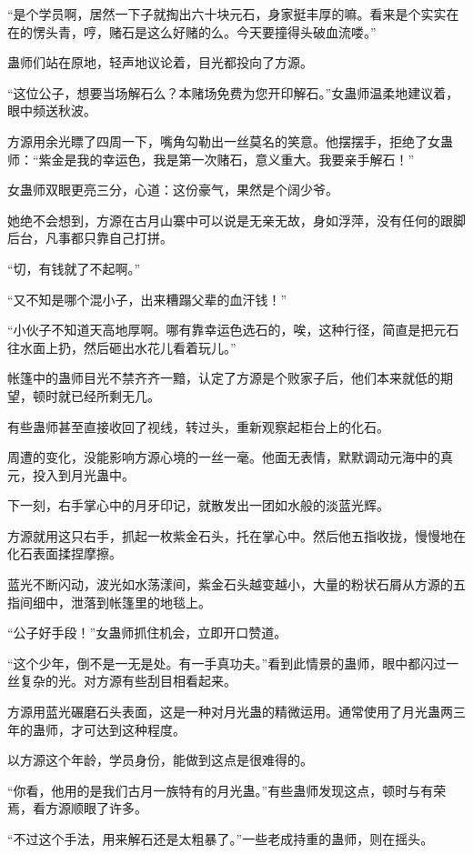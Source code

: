 \begin{this_body}
“是个学员啊，居然一下子就掏出六十块元石，身家挺丰厚的嘛。看来是个实实在在的愣头青，哼，赌石是这么好赌的么。今天要撞得头破血流喽。”

蛊师们站在原地，轻声地议论着，目光都投向了方源。

“这位公子，想要当场解石么？本赌场免费为您开印解石。”女蛊师温柔地建议着，眼中频送秋波。

方源用余光瞟了四周一下，嘴角勾勒出一丝莫名的笑意。他摆摆手，拒绝了女蛊师：“紫金是我的幸运色，我是第一次赌石，意义重大。我要亲手解石！”

女蛊师双眼更亮三分，心道：这份豪气，果然是个阔少爷。

她绝不会想到，方源在古月山寨中可以说是无亲无故，身如浮萍，没有任何的跟脚后台，凡事都只靠自己打拼。

“切，有钱就了不起啊。”

“又不知是哪个混小子，出来糟蹋父辈的血汗钱！”

“小伙子不知道天高地厚啊。哪有靠幸运色选石的，唉，这种行径，简直是把元石往水面上扔，然后砸出水花儿看着玩儿。”

帐篷中的蛊师目光不禁齐齐一黯，认定了方源是个败家子后，他们本来就低的期望，顿时就已经所剩无几。

有些蛊师甚至直接收回了视线，转过头，重新观察起柜台上的化石。

周遭的变化，没能影响方源心境的一丝一毫。他面无表情，默默调动元海中的真元，投入到月光蛊中。

下一刻，右手掌心中的月牙印记，就散发出一团如水般的淡蓝光辉。

方源就用这只右手，抓起一枚紫金石头，托在掌心中。然后他五指收拢，慢慢地在化石表面揉捏摩擦。

蓝光不断闪动，波光如水荡漾间，紫金石头越变越小，大量的粉状石屑从方源的五指间细中，泄落到帐篷里的地毯上。

“公子好手段！”女蛊师抓住机会，立即开口赞道。

“这个少年，倒不是一无是处。有一手真功夫。”看到此情景的蛊师，眼中都闪过一丝复杂的光。对方源有些刮目相看起来。

方源用蓝光碾磨石头表面，这是一种对月光蛊的精微运用。通常使用了月光蛊两三年的蛊师，才可达到这种程度。

以方源这个年龄，学员身份，能做到这点是很难得的。

“你看，他用的是我们古月一族特有的月光蛊。”有些蛊师发现这点，顿时与有荣焉，看方源顺眼了许多。

“不过这个手法，用来解石还是太粗暴了。”一些老成持重的蛊师，则在摇头。


\end{this_body}
